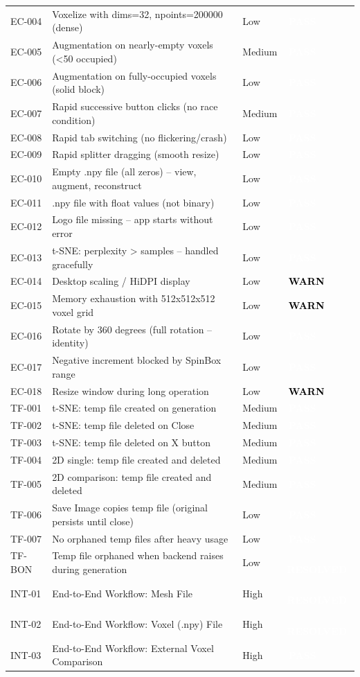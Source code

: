\documentclass[12pt,a4paper]{article}
\newcommand{\statuspass}{\colorbox{statusgreen}{\textcolor{white}{\textbf{\,PASS\,}}}}
\newcommand{\statuswarn}{\colorbox{statusyellow}{\textcolor{black}{\textbf{\,WARN\,}}}}
\newcommand{\statusresolved}{\colorbox{statusorange}{\textcolor{white}{\textbf{\,RESOLVED\,}}}}
\begin{document}
{\begin{longtable}{p{1.7cm}p{7.7cm}p{1.3cm}p{2cm}}
EC-004 & Voxelize with dims=32, npoints=200000 (dense) & Low & \statuspass \\
EC-005 & Augmentation on nearly-empty voxels (<50 occupied) & Medium & \statuspass \\
EC-006 & Augmentation on fully-occupied voxels (solid block) & Low & \statuspass \\
EC-007 & Rapid successive button clicks (no race condition) & Medium & \statuspass \\
EC-008 & Rapid tab switching (no flickering/crash) & Low & \statuspass \\
EC-009 & Rapid splitter dragging (smooth resize) & Low & \statuspass \\
EC-010 & Empty .npy file (all zeros) -- view, augment, reconstruct & Low & \statuspass \\
EC-011 & .npy file with float values (not binary) & Low & \statuspass \\
EC-012 & Logo file missing -- app starts without error & Low & \statuspass \\
EC-013 & t-SNE: perplexity > samples -- handled gracefully & Low & \statuspass \\
EC-014 & Desktop scaling / HiDPI display & Low & \statuswarn \\
EC-015 & Memory exhaustion with 512x512x512 voxel grid & Low & \statuswarn \\
EC-016 & Rotate by 360 degrees (full rotation -- identity) & Low & \statuspass \\
EC-017 & Negative increment blocked by SpinBox range & Low & \statuspass \\
EC-018 & Resize window during long operation & Low & \statuswarn \\
TF-001 & t-SNE: temp file created on generation & Medium & \statuspass \\
TF-002 & t-SNE: temp file deleted on Close & Medium & \statuspass \\
TF-003 & t-SNE: temp file deleted on X button & Medium & \statuspass \\
TF-004 & 2D single: temp file created and deleted & Medium & \statuspass \\
TF-005 & 2D comparison: temp file created and deleted & Medium & \statuspass \\
TF-006 & Save Image copies temp file (original persists until close) & Low & \statuspass \\
TF-007 & No orphaned temp files after heavy usage & Low & \statuspass \\
TF-BON & Temp file orphaned when backend raises during generation & Low & \statusresolved \\
INT-01 & End-to-End Workflow: Mesh File & High & \statusresolved \\
INT-02 & End-to-End Workflow: Voxel (.npy) File & High & \statusresolved \\
INT-03 & End-to-End Workflow: External Voxel Comparison & High & \statuspass \\
\bottomrule
\end{longtable}
}
\end{document}
